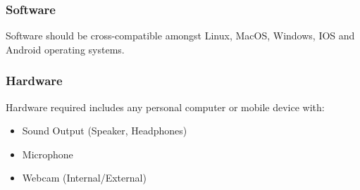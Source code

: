 \documentclass{article}
\begin{document}
\subsubsection{Software}
Software should be cross-compatible amongst Linux, MacOS, Windows, IOS and Android operating systems.
\subsubsection{Hardware}
Hardware required includes any personal computer or mobile device with:
\begin{itemize}
    \item Sound Output (Speaker, Headphones)
    \item Microphone
    \item Webcam (Internal/External)
\end{itemize}
\end{document}

